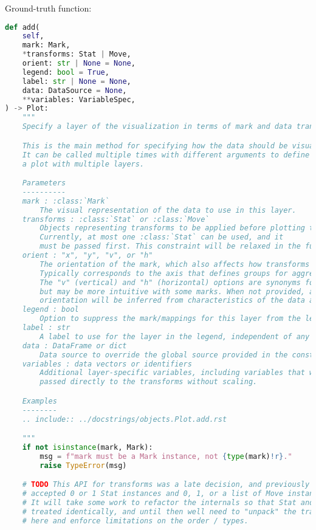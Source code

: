 Ground-truth function:
\begin{lstlisting}[language=Python]
def add(
    self,
    mark: Mark,
    *transforms: Stat | Move,
    orient: str | None = None,
    legend: bool = True,
    label: str | None = None,
    data: DataSource = None,
    **variables: VariableSpec,
) -> Plot:
    """
    Specify a layer of the visualization in terms of mark and data transform(s).

    This is the main method for specifying how the data should be visualized.
    It can be called multiple times with different arguments to define
    a plot with multiple layers.

    Parameters
    ----------
    mark : :class:`Mark`
        The visual representation of the data to use in this layer.
    transforms : :class:`Stat` or :class:`Move`
        Objects representing transforms to be applied before plotting the data.
        Currently, at most one :class:`Stat` can be used, and it
        must be passed first. This constraint will be relaxed in the future.
    orient : "x", "y", "v", or "h"
        The orientation of the mark, which also affects how transforms are computed.
        Typically corresponds to the axis that defines groups for aggregation.
        The "v" (vertical) and "h" (horizontal) options are synonyms for "x" / "y",
        but may be more intuitive with some marks. When not provided, an
        orientation will be inferred from characteristics of the data and scales.
    legend : bool
        Option to suppress the mark/mappings for this layer from the legend.
    label : str
        A label to use for the layer in the legend, independent of any mappings.
    data : DataFrame or dict
        Data source to override the global source provided in the constructor.
    variables : data vectors or identifiers
        Additional layer-specific variables, including variables that will be
        passed directly to the transforms without scaling.

    Examples
    --------
    .. include:: ../docstrings/objects.Plot.add.rst

    """
    if not isinstance(mark, Mark):
        msg = f"mark must be a Mark instance, not {type(mark)!r}."
        raise TypeError(msg)

    # TODO This API for transforms was a late decision, and previously Plot.add
    # accepted 0 or 1 Stat instances and 0, 1, or a list of Move instances.
    # It will take some work to refactor the internals so that Stat and Move are
    # treated identically, and until then well need to "unpack" the transforms
    # here and enforce limitations on the order / types.


\end{lstlisting}
